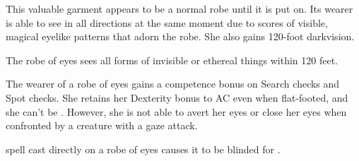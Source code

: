 \begin{comment}
Robe of Bones: This handy item functions much like a robe of useful items for the serious necromancer. It appears to be an unremarkable robe, but a character who dons it notes that it is adorned with small embroidered figures representing undead creatures. Only the wearer of the robe can see the embroidery and recognize them for the creatures they become, and detach them. One figure can be detached each round. Detaching a figure causes it to become an actual undead creature (see the list below). The skeleton or zombie is not under the control of the wearer of the robe, but may be subsequently commanded, rebuked, turned, or destroyed. A newly created robe of bones always has two embroidered figures of each of the following undead:
\begin{itemize*}
\item Small goblin skeleton
\item Medium human commoner skeleton
\item Medium wolf skeleton
\item Small goblin zombie
\item Medium human commoner zombie
\item Medium wolf zombie
\end{itemize*}

Moderate necromancy [evil]; CL 6th; Craft Wondrous Item, animate dead; Price 2,400 gp; Weight 1 lb.
\end{comment}
 This valuable garment appears to be a normal robe until it is put on. Its wearer is able to see in all directions at the same moment due to scores of visible, magical eyelike patterns that adorn the robe. She also gains 120-foot darkvision.

The robe of eyes sees all forms of invisible or ethereal things within 120 feet.

The wearer of a robe of eyes gains a  competence bonus on Search checks and Spot checks. She retains her Dexterity bonus to AC even when flat-footed, and she can't be . However, she is not able to avert her eyes or close her eyes when confronted by a creature with a gaze attack.

 spell cast directly on a robe of eyes causes it to be blinded for .

